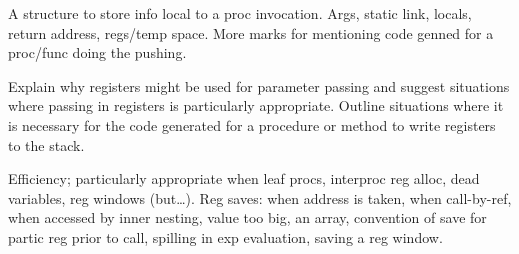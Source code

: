 \documentclass[11pt]{cityexam}
\begin{document}
\begin{questions}
\begin{subquestions}
\begin{modelanswer}
A structure to store info local to a proc invocation.
Args, static link, locals, return address, regs/temp space.
More marks for mentioning code genned for a proc/func doing the
pushing.
\end{modelanswer}

\subquestion
Explain why registers might be used for parameter passing and
suggest situations where passing in registers is particularly
appropriate. 
Outline situations where it is necessary for the code generated for a 
procedure or method to write registers to the stack.

\begin{modelanswer}
Efficiency; particularly appropriate when leaf procs, interproc
reg alloc, dead variables, reg windows (but\ldots).
Reg saves: when address is taken,
when call-by-ref,
when accessed by inner nesting,
value too big,
an array,
convention of save for partic reg prior to call,
spilling in exp evaluation,
saving a reg window.
\end{modelanswer}

\end{subquestions}


\end{questions}
\end{document}
